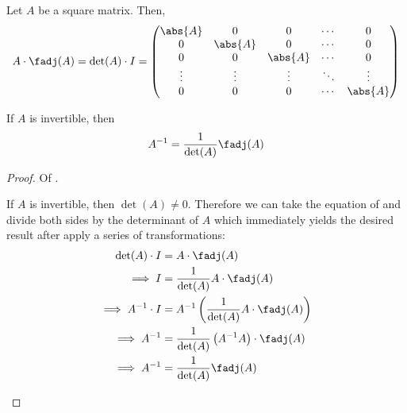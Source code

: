 \begin{thm}\label{thm-adj-det-equation}
	Let $A$ be a square matrix. Then,
	\begin{equation}
		A\cdot\fadj(A)=\det(A)\cdot I = \begin{pmatrix}
			\abs{A} & 0       & 0       & \cdots & 0       \\
			0       & \abs{A} & 0       & \cdots & 0       \\
			0       & 0       & \abs{A} & \cdots & 0       \\
			\vdots  & \vdots  & \vdots  & \ddots & \vdots  \\
			0       & 0       & 0       & \cdots & \abs{A}\end{pmatrix}
	\end{equation}
\end{thm}

\begin{crl}\label{crl-inverse-adjugate-eq}
	If $A$ is invertible, then
	\begin{equation}
		A^{-1}=\frac{1}{\det(A)}\fadj(A)
	\end{equation}
\end{crl}

\begin{proof}
	Of .
	\begin{flushleft}
		If $A$ is invertible, then $\det(A)\neq0$. Therefore we can take the
		equation of  and divide both sides
		by the determinant of $A$ which immediately yields the desired result after
		apply a series of transformations:
		\begin{align*}
			\det(A)\cdot I         & = A\cdot\fadj(A)                                    \\
			\implies I             & =\frac{1}{\det(A)}A\cdot\fadj(A)                    \\
			\implies A^{-1}\cdot I & =A^{-1}\left(\frac{1}{\det(A)}A\cdot\fadj(A)\right) \\
			\implies A^{-1}        & =\frac{1}{\det(A)}\left(A^{-1}A\right)\cdot\fadj(A) \\
			\implies A^{-1}        & =\frac{1}{\det(A)}\fadj(A)
		\end{align*}
	\end{flushleft}
\end{proof}

